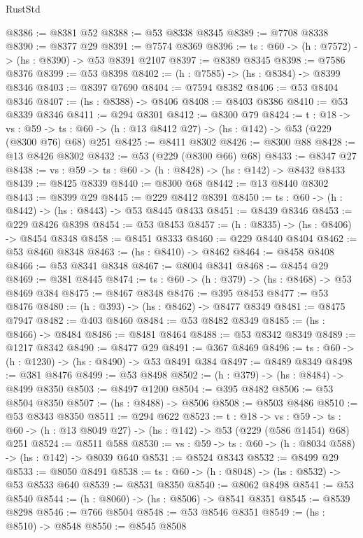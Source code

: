\begin{lexlean}{RustStd}
\begin{coremodule}
@8386 := @8381 @52
@8388 := @53 @8338 @8345
@8389 := @7708 @8338
@8390 := @8377 @29
@8391 := @7574 @8369
@8396 := {ts : @60} -> (h : @7572) -> (hs : @8390) -> @53 @8391 @2107
@8397 := @8389 @8345
@8398 := @7586 @8376
@8399 := @53 @8398
@8402 := (h : @7585) -> (hs : @8384) -> @8399 @8346
@8403 := @8397 @7690
@8404 := @7594 @8382
@8406 := @53 @8404 @8346
@8407 := (hs : @8388) -> @8406
@8408 := @8403 @8386
@8410 := @53 @8339 @8346
@8411 := @294 @8301
@8412 := @8300 @79
@8424 := {t : @18} ->
  {vs : @59} -> {ts : @60} -> (h : @13 @8412 @27) -> (hs : @142) -> @53 (@229 (@8300 @76) @68) @251
@8425 := @8411 @8302
@8426 := @8300 @88
@8428 := @13 @8426 @8302
@8432 := @53 (@229 (@8300 @66) @68)
@8433 := @8347 @27
@8438 := {vs : @59} -> {ts : @60} -> (h : @8428) -> (hs : @142) -> @8432 @8433
@8439 := @8425 @8339
@8440 := @8300 @68
@8442 := @13 @8440 @8302
@8443 := @8399 @29
@8445 := @229 @8412 @8391
@8450 := {ts : @60} -> (h : @8442) -> (hs : @8443) -> @53 @8445 @8433
@8451 := @8439 @8346
@8453 := @229 @8426 @8398
@8454 := @53 @8453
@8457 := (h : @8335) -> (hs : @8406) -> @8454 @8348
@8458 := @8451 @8333
@8460 := @229 @8440 @8404
@8462 := @53 @8460 @8348
@8463 := (hs : @8410) -> @8462
@8464 := @8458 @8408
@8466 := @53 @8341 @8348
@8467 := @8004 @8341
@8468 := @8454 @29
@8469 := @381 @8445
@8474 := {ts : @60} -> (h : @379) -> (hs : @8468) -> @53 @8469 @384
@8475 := @8467 @8348
@8476 := @395 @8453
@8477 := @53 @8476
@8480 := (h : @393) -> (hs : @8462) -> @8477 @8349
@8481 := @8475 @7947
@8482 := @403 @8460
@8484 := @53 @8482 @8349
@8485 := (hs : @8466) -> @8484
@8486 := @8481 @8464
@8488 := @53 @8342 @8349
@8489 := @1217 @8342
@8490 := @8477 @29
@8491 := @367 @8469
@8496 := {ts : @60} -> (h : @1230) -> (hs : @8490) -> @53 @8491 @384
@8497 := @8489 @8349
@8498 := @381 @8476
@8499 := @53 @8498
@8502 := (h : @379) -> (hs : @8484) -> @8499 @8350
@8503 := @8497 @1200
@8504 := @395 @8482
@8506 := @53 @8504 @8350
@8507 := (hs : @8488) -> @8506
@8508 := @8503 @8486
@8510 := @53 @8343 @8350
@8511 := @294 @622
@8523 := {t : @18} ->
  {vs : @59} -> {ts : @60} -> (h : @13 @8049 @27) -> (hs : @142) -> @53 (@229 (@586 @1454) @68) @251
@8524 := @8511 @588
@8530 := {vs : @59} -> {ts : @60} -> (h : @8034 @588) -> (hs : @142) -> @8039 @640
@8531 := @8524 @8343
@8532 := @8499 @29
@8533 := @8050 @8491
@8538 := {ts : @60} -> (h : @8048) -> (hs : @8532) -> @53 @8533 @640
@8539 := @8531 @8350
@8540 := @8062 @8498
@8541 := @53 @8540
@8544 := (h : @8060) -> (hs : @8506) -> @8541 @8351
@8545 := @8539 @8298
@8546 := @766 @8504
@8548 := @53 @8546 @8351
@8549 := (hs : @8510) -> @8548
@8550 := @8545 @8508

\end{coremodule}
\end{lexlean}

